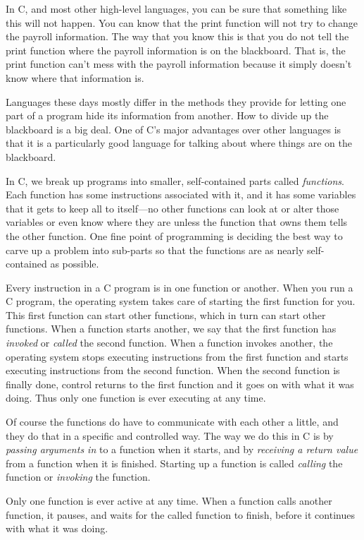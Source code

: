     In C, and most other high-level languages, you can be sure that
something like this will not happen. You can know that the print
function will not try to change the payroll information.  The way that
you know this is that you do not tell the print function where the
payroll information is on the blackboard.  That is, the print function
can't mess with the payroll information because it simply doesn't know
where that information is.

    Languages these days mostly differ in the methods they provide for
letting one part of a program hide its information from another.  How to
divide up the blackboard is a big deal.  One of C's major advantages
over other languages is that it is a particularly good language for
talking about where things are on the blackboard.

    In C, we break up programs into smaller, self-contained parts called
{\em functions}.  Each function has some instructions associated with
it, and it has some variables that it gets to keep all to itself---no
other functions can look at or alter those variables or even know where
they are unless the function that owns them tells the other function.
One fine point of programming is deciding the best way to carve up a
problem into sub-parts so that the functions are as nearly
self-contained as possible.

    Every instruction in a C program is in one function or another.
When you run a C program, the operating system takes care of starting
the first function for you.  This first function can start other
functions, which in turn can start other functions.  When a function
starts another, we say that the first function has {\em invoked}\/ or
{\em called}\/ the second function.  When a function invokes another,
the operating system stops executing instructions from the first
function and starts executing instructions from the second function.
When the second function is finally done, control returns to the first
function and it goes on with what it was doing.  Thus only one function
is ever executing at any time.

    Of course the functions do have to communicate with each other a
little, and they do that in a specific and controlled way.  The way we
do this in C is by {\em passing arguments in}\/ to a function when it
starts, and by {\em receiving a return value} from a function when it is
finished.  Starting up a function is called {\em calling}\/ the
function or {\em invoking}\/ the function.

    Only one function is ever active at any time.  When a function calls
another function, it pauses, and waits for the called function to
finish, before it continues with what it was doing.

